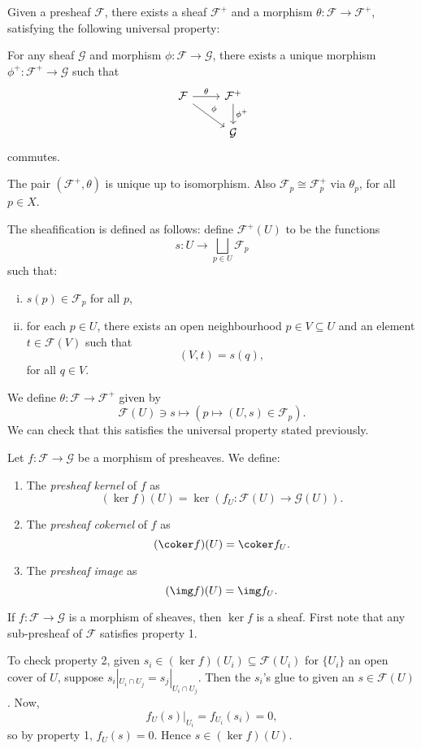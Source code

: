\documentclass[12pt]{article}
\begin{document}
Given a presheaf $\mathcal{F}$, there exists a sheaf $\mathcal{F}^+$ and a morphism $\theta : \mathcal{F} \to \mathcal{F}^+$, satisfying the following universal property:

For any sheaf $\mathcal{G}$ and morphism $\phi : \mathcal{F} \to \mathcal{G}$, there exists a unique morphism $\phi^+ : \mathcal{F}^+ \to \mathcal{G}$ such that
\[
\begin{tikzcd}
	\mathcal{F} \arrow[r, "\theta"] \arrow[dr, "\phi"] & \mathcal{F}^+ \arrow[d, "\phi^+"] \\
							   & \mathcal{G}
\end{tikzcd}
\]
commutes.

The pair $(\mathcal{F}^+, \theta)$ is unique up to isomorphism. Also $\mathcal{F}_p \cong \mathcal{F}_p^+$ via $\theta_p$, for all $p \in X$.


The sheafification is defined as follows: define $\mathcal{F}^+(U)$ to be the functions
\[
s : U \to \bigsqcup_{p \in U} \mathcal{F}_p
\]
such that:
\begin{enumerate}[(i)]
	\item $s(p) \in \mathcal{F}_p$ for all $p$,
	\item for each $p \in U$, there exists an open neighbourhood $p \in V \subseteq U$ and an element $t \in \mathcal{F}(V)$ such that
		\[
			(V, t) = s(q),
		\]
		for all $q \in V$.
\end{enumerate}
We define $\theta : \mathcal{F} \to \mathcal{F}^+$ given by
\[
	\mathcal{F}(U) \ni s \mapsto (p \mapsto (U, s) \in \mathcal{F}_p).
\]
We can check that this satisfies the universal property stated previously.

\begin{definition}
	Let $f : \mathcal{F} \to \mathcal{G}$ be a morphism of presheaves. We define:
	\begin{enumerate}
		\item The \emph{presheaf kernel} of $f$ as
			\[
				(\ker f)(U) = \ker (f_U : \mathcal{F}(U) \to \mathcal{G}(U)).
			\]
		\item The \emph{presheaf cokernel} of $f$ as
			\[
				(\coker f)(U) = \coker f_U.
			\]
		\item The \emph{presheaf image} as
			\[
				(\img f)(U) = \img f_U.
			\]
	\end{enumerate}
\end{definition}

\begin{remark}
	If $f : \mathcal{F}\to \mathcal{G}$ is a morphism of sheaves, then $\ker f$ is a sheaf. First note that any sub-presheaf of $\mathcal{F}$ satisfies property 1.

	To check property 2, given $s_i \in (\ker f)(U_i) \subseteq \mathcal{F}(U_i)$ for $\{U_i\}$ an open cover of $U$, suppose $s_i |_{U_i \cap U_j} = s_j |_{U_i \cap U_j}$. Then the $s_i$'s glue to given an $s \in \mathcal{F}(U)$. Now,
	\[
	f_U(s) |_{U_i} = f_{U_i} (s_i) = 0,
	\]
	so by property 1, $f_U(s) = 0$. Hence $s \in (\ker f)(U)$.
\end{remark}
\end{document}
